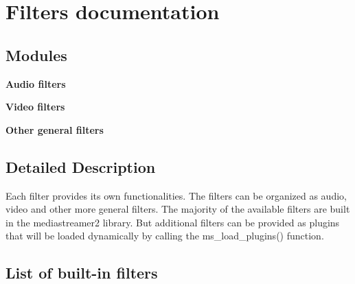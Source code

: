 \section{Filters documentation}
\label{group__filters}
\subsection*{Modules}
\begin{DoxyCompactItemize}
\item 
\textbf{ Audio filters}
\item 
\textbf{ Video filters}
\item 
\textbf{ Other general filters}
\end{DoxyCompactItemize}


\subsection{Detailed Description}
Each filter provides its own functionalities. The filters can be organized as audio, video and other more general filters. The majority of the available filters are built in the mediastreamer2 library. But additional filters can be provided as plugins that will be loaded dynamically by calling the ms\+\_\+load\+\_\+plugins() function.\subsection{List of built-\/in filters}\label{group__filters_list_of_filters}

